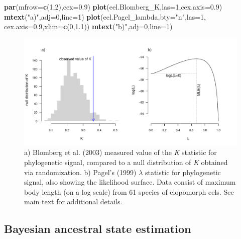 \documentclass[fleqn,10pt,lineno]{wlpeerj} %
\newenvironment{Shaded}{\begin{snugshade}}{\end{snugshade}}
\newcommand{\AttributeTok}[1]{\textcolor[rgb]{0.13,0.29,0.53}{#1}}
\newcommand{\DecValTok}[1]{\textcolor[rgb]{0.00,0.00,0.81}{#1}}
\newcommand{\FloatTok}[1]{\textcolor[rgb]{0.00,0.00,0.81}{#1}}
\newcommand{\FunctionTok}[1]{\textcolor[rgb]{0.13,0.29,0.53}{\textbf{#1}}}
\newcommand{\NormalTok}[1]{#1}
\newcommand{\StringTok}[1]{\textcolor[rgb]{0.31,0.60,0.02}{#1}}
\begin{document}
\begin{Shaded}
\begin{Highlighting}[]
\FunctionTok{par}\NormalTok{(}\AttributeTok{mfrow=}\FunctionTok{c}\NormalTok{(}\DecValTok{1}\NormalTok{,}\DecValTok{2}\NormalTok{),}\AttributeTok{cex=}\FloatTok{0.9}\NormalTok{)}
\FunctionTok{plot}\NormalTok{(eel.Blomberg\_K,}\AttributeTok{las=}\DecValTok{1}\NormalTok{,}\AttributeTok{cex.axis=}\FloatTok{0.9}\NormalTok{)}
\FunctionTok{mtext}\NormalTok{(}\StringTok{"a)"}\NormalTok{,}\AttributeTok{adj=}\DecValTok{0}\NormalTok{,}\AttributeTok{line=}\DecValTok{1}\NormalTok{)}
\FunctionTok{plot}\NormalTok{(eel.Pagel\_lambda,}\AttributeTok{bty=}\StringTok{"n"}\NormalTok{,}\AttributeTok{las=}\DecValTok{1}\NormalTok{,}
  \AttributeTok{cex.axis=}\FloatTok{0.9}\NormalTok{,}\AttributeTok{xlim=}\FunctionTok{c}\NormalTok{(}\DecValTok{0}\NormalTok{,}\FloatTok{1.1}\NormalTok{))}
\FunctionTok{mtext}\NormalTok{(}\StringTok{"b)"}\NormalTok{,}\AttributeTok{adj=}\DecValTok{0}\NormalTok{,}\AttributeTok{line=}\DecValTok{1}\NormalTok{)}
\end{Highlighting}
\end{Shaded}

\begin{figure}
\includegraphics[width=1\linewidth]{Revell.phytools-v2_peerj_files/figure-latex/phylosig-1} \caption{a) Blomberg et al. (2003) measured value of the \textit{K} statistic for phylogenetic signal, compared to a null distribution of \textit{K} obtained via randomization. b) Pagel's (1999) $\lambda$ statistic for phylogenetic signal, also showing the likelihood surface. Data consist of maximum body length (on a log scale) from 61 species of elopomorph eels. See main text for additional details.}\label{fig:phylosig}
\end{figure}

\hypertarget{bayesian-ancestral-state-estimation}{%
\subsection{Bayesian ancestral state estimation}\label{bayesian-ancestral-state-estimation}}
\end{document}
